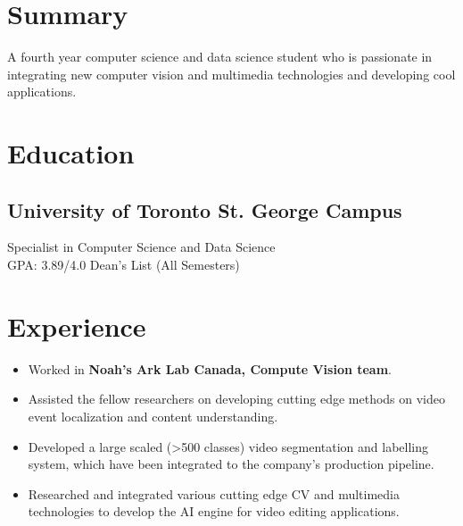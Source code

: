 \documentclass[letterpaper]{deedy-resume} %
\begin{document}
\hfill
%
%
\begin{minipage}[t]{0.66\textwidth} %

\section{Summary}
A fourth year computer science and data science student who is passionate in integrating new computer vision and multimedia technologies and developing cool applications.

\section{Education} 

\subsection{University of Toronto St. George Campus}
Specialist in Computer Science and Data Science\\
GPA: 3.89/4.0 Dean's List (All Semesters) \\

\section{Experience}

\begin{itemize}[noitemsep,topsep=0pt,leftmargin=*]
\item Worked in \textbf{Noah's Ark Lab Canada, Compute Vision team}.
\item Assisted the fellow researchers on developing cutting edge methods on video event localization and content understanding.
\item Developed a large scaled (>500 classes) video segmentation and labelling system, which have been integrated to the company's production pipeline.
\item Researched and integrated various cutting edge CV and multimedia technologies to develop the AI engine for video editing applications. 
\end{itemize}



\end{minipage}
\end{document}
